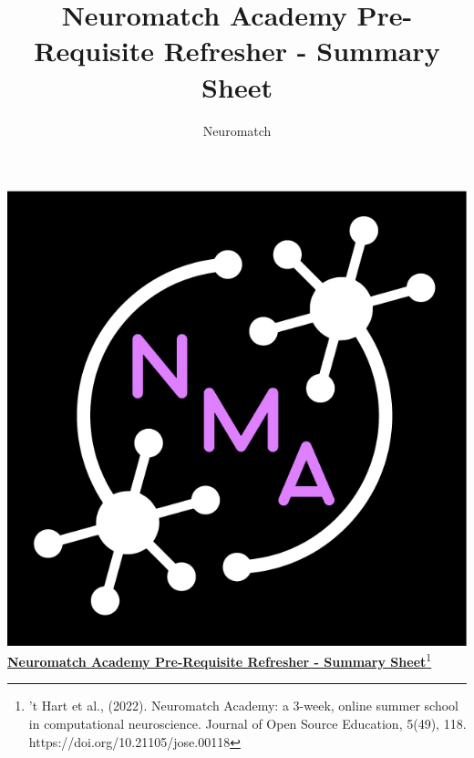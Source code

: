 \documentclass[10pt,a4paper]{article}
\title{Neuromatch Academy Pre-Requisite Refresher - Summary Sheet}
\author{Neuromatch}
\begin{document}
\includegraphics[scale=0.1]{Figures/nma-logo-square-4xp.jpeg}\href{https://compneuro.neuromatch.io/tutorials/intro.html}{\textbf{\Huge{Neuromatch Academy Pre-Requisite Refresher - Summary Sheet}}\footnote{’t Hart et al., (2022). Neuromatch Academy: a 3-week, online summer school in computational neuroscience. Journal of Open Source Education, 5(49), 118. https://doi.org/10.21105/jose.00118}}
\small
\begin{multicols}{3}
\let\clearpage\relax

\clearpage

\clearpage

\end{multicols}
\end{document}
